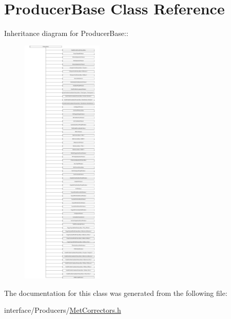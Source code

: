 \hypertarget{classProducerBase}{
\section{ProducerBase Class Reference}
\label{classProducerBase}
}
Inheritance diagram for ProducerBase::\begin{figure}[H]
\begin{center}
\leavevmode
\includegraphics[height=12cm]{classProducerBase}
\end{center}
\end{figure}


The documentation for this class was generated from the following file:\begin{DoxyCompactItemize}
\item 
interface/Producers/\hyperlink{MetCorrectors_8h}{MetCorrectors.h}\end{DoxyCompactItemize}
